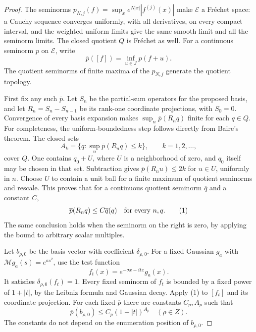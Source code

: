 \begin{proof}
The seminorms $p_{N,j}(f)=\sup_x e^{N|x|}|f^{(j)}(x)|$ make
$\mathcal E$ a Fr\'echet space: a Cauchy sequence converges uniformly,
with all derivatives, on every compact interval, and the weighted
uniform limits give the same smooth limit and all the seminorm
limits. The closed quotient $Q$ is Fr\'echet as well.
For a continuous seminorm $p$ on $\mathcal E$, write
\[
 \overline p([f])=\inf_{u\in J}p(f+u).
\]
The quotient seminorms of finite maxima of the $p_{N,j}$ generate
the quotient topology.

First fix any such $\overline p$. Let $S_n$ be the partial-sum
operators for the proposed basis, and let $R_n=S_n-S_{n-1}$ be
its rank-one coordinate projections, with $S_0=0$.
Convergence of every basis expansion makes
$\sup_n\overline p(R_nq)$ finite for each $q\in Q$.
For completeness, the uniform-boundedness step follows directly
from Baire's theorem. The closed sets
\[
 A_k=\{q:\sup_n\overline p(R_nq)\le k\},\qquad k=1,2,\ldots,
\]
cover $Q$. One contains $q_0+U$, where $U$ is a neighborhood of
zero, and $q_0$ itself may be chosen in that set. Subtraction
gives $\overline p(R_nu)\le2k$ for $u\in U$, uniformly in $n$.
Choose $U$ to contain a unit ball for a finite maximum of
quotient seminorms and rescale. This proves that for a continuous
quotient seminorm $\overline q$ and a constant $C$,
\[
             \overline p(R_nq)\le C\overline q(q)
                         \quad\hbox{for every }n,q.    \tag{1}
\]
The same conclusion holds when the seminorm on the right is
zero, by applying the bound to arbitrary scalar multiples.

Let $b_{\rho,0}$ be the basis vector with coefficient
$\delta_{\rho,0}$. For a fixed Gaussian $g_a$ with
$\mathcal Mg_a(s)=e^{as^2}$, use the test function
\[
                f_t(x)=e^{-\sigma x-itx}g_a(x).
\]
It satisfies $\delta_{\rho,0}(f_t)=1$.
Every fixed seminorm of $f_t$ is bounded by a fixed power of
$1+|t|$, by the Leibniz formula and Gaussian decay.
Apply (1) to $[f_t]$ and its coordinate projection. For each
fixed $\overline p$ there are constants $C_p,A_p$ such that
\[
       \overline p(b_{\rho,0})\le C_p(1+|t|)^{A_p}
                                      \quad(\rho\in Z). \tag{2}
\]
The constants do not depend on the enumeration position of
$b_{\rho,0}$.


\end{proof}
